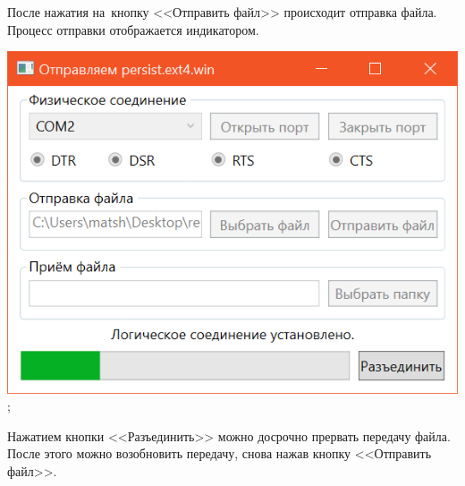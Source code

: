 \documentclass[a4paper,12pt]{article}
\begin{document}
После нажатия на~кнопку <<Отправить файл>> происходит отправка файла. Процесс отправки отображается индикатором.
\begin{center}
\includegraphics{progress.png};
\end{center}

Нажатием кнопки <<Разъединить>> можно досрочно прервать передачу файла. После этого можно возобновить передачу, снова нажав кнопку <<Отправить файл>>.
\end{document}
